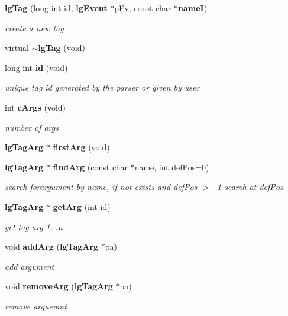 \begin{CompactItemize}
{\bf lg\-Tag} (long int id, {\bf lg\-Event} $\ast$p\-Ev, const char $\ast${\bf name\-I})
\begin{CompactList}\small\item\em create a new tag \item\end{CompactList}\item 
virtual {\bf $\sim$lg\-Tag} (void)
\item 
long int {\bf id} (void)
\begin{CompactList}\small\item\em unique tag id generated by the parser or given by user \item\end{CompactList}\item 
int {\bf c\-Args} (void)
\begin{CompactList}\small\item\em number of args \item\end{CompactList}\item 
{\bf lg\-Tag\-Arg} $\ast$ {\bf first\-Arg} (void)
\item 
{\bf lg\-Tag\-Arg} $\ast$ {\bf find\-Arg} (const char $\ast$name, int def\-Pos=0)
\begin{CompactList}\small\item\em search forargument by name, if not exists and def\-Pos $>$ -1 search at def\-Pos \item\end{CompactList}\item 
{\bf lg\-Tag\-Arg} $\ast$ {\bf get\-Arg} (int id)
\begin{CompactList}\small\item\em get tag arg 1...n \item\end{CompactList}\item 
void {\bf add\-Arg} ({\bf lg\-Tag\-Arg} $\ast$pa)
\begin{CompactList}\small\item\em add argument \item\end{CompactList}\item 
void {\bf remove\-Arg} ({\bf lg\-Tag\-Arg} $\ast$pa)
\begin{CompactList}\small\item\em remove arguemnt \item\end{CompactList}\item 

\end{CompactItemize}

